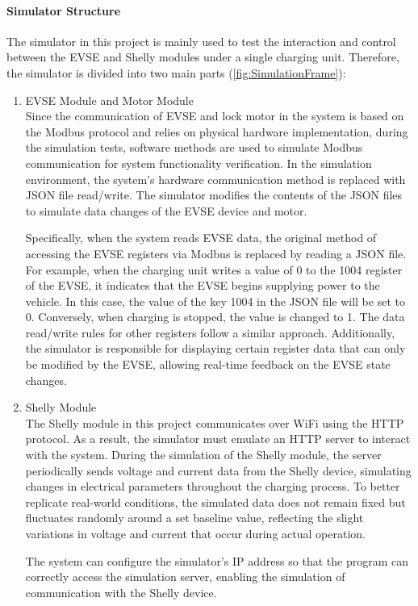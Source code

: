 \documentclass[
	english,
	ruledheaders=section,%
	class=report,%
	thesis={type=Report},%
	accentcolor=9c,%
	custommargins=true,%
	marginpar=false,%
	parskip=half-,%
	fontsize=11pt,%
	logofile={img/tuda_logo.pdf}, %
]{tudapub}
\begin{document}
\paragraph{Simulator Structure}
The simulator in this project is mainly used to test the interaction and control between the EVSE and Shelly modules under a single charging unit. Therefore, the simulator is divided into two main parts (\autoref{fig:SimulationFrame}):
\begin{enumerate}
    \item EVSE Module and Motor Module\\
    Since the communication of EVSE and lock motor in the system is based on the Modbus protocol and relies on physical hardware implementation, during the simulation tests, software methods are used to simulate Modbus communication for system functionality verification. In the simulation environment, the system's hardware communication method is replaced with JSON file read/write. The simulator modifies the contents of the JSON files to simulate data changes of the EVSE device and motor.

    Specifically, when the system reads EVSE data, the original method of accessing the EVSE registers via Modbus is replaced by reading a JSON file. For example, when the charging unit writes a value of 0 to the 1004 register of the EVSE, it indicates that the EVSE begins supplying power to the vehicle. In this case, the value of the key 1004 in the JSON file will be set to 0. Conversely, when charging is stopped, the value is changed to 1. The data read/write rules for other registers follow a similar approach. Additionally, the simulator is responsible for displaying certain register data that can only be modified by the EVSE, allowing real-time feedback on the EVSE state changes.

    \item Shelly Module\\
    The Shelly module in this project communicates over WiFi using the HTTP protocol. As a result, the simulator must emulate an HTTP server to interact with the system. During the simulation of the Shelly module, the server periodically sends voltage and current data from the Shelly device, simulating changes in electrical parameters throughout the charging process. To better replicate real-world conditions, the simulated data does not remain fixed but fluctuates randomly around a set baseline value, reflecting the slight variations in voltage and current that occur during actual operation.

    The system can configure the simulator's IP address so that the program can correctly access the simulation server, enabling the simulation of communication with the Shelly device.
\end{enumerate}
\end{document}
